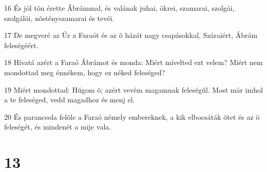 \par 16 És jól tõn érette Ábrámmal, és valának juhai, ökrei, szamarai, szolgái, szolgálói, nõstényszamarai és tevéi.
\par 17 De megveré az Úr a Faraót és az õ házát nagy csapásokkal, Száraiért, Ábrám feleségéért.
\par 18 Hívatá azért a Faraó Ábrámot és monda: Miért mívelted ezt velem? Miért nem mondottad meg énnékem, hogy ez néked feleséged?
\par 19 Miért mondottad: Húgom õ; azért vevém magamnak feleségûl. Most már imhol a te feleséged, vedd magadhoz és menj el.
\par 20 És parancsola felõle a Faraó némely embereknek, a kik elbocsáták õtet és az õ feleségét, és mindenét a mije vala.

\chapter{13}

